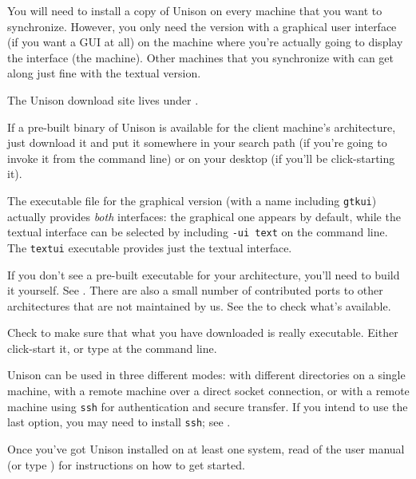 \documentclass{article}
\begin{document}
You will need to install a copy of Unison on every machine that you
want to synchronize.  However, you only need the version with a
graphical user interface (if you want a GUI at all) on the machine
where you're actually going to display the interface (the \CLIENT{}
machine).  Other machines that you synchronize with can get along just
fine with the textual version.



The Unison download site lives under 
.

If a pre-built binary of Unison is available for the client machine's
architecture, just download it and put it somewhere in your search
path (if you're going to invoke it from the command line) or on your
desktop (if you'll be click-starting it).

The executable file for the graphical version (with a name including
\verb|gtkui|) actually provides {\em both} interfaces: the graphical one
appears by default, while the textual interface can be selected by including
\verb|-ui text| on the command line.  The \verb|textui| executable
provides just the textual interface.

If you don't see a pre-built executable for your architecture, you'll
need to build it yourself.  See .
There are also a small number of contributed ports to other
architectures that are not maintained by us.  See the
 to check what's available.

Check to make sure that what you have downloaded is really executable.
Either click-start it, or type  at the command
line.  

Unison can be used in three different modes: with different directories on a
single machine, with a remote machine over a direct socket connection, or
with a remote machine using {\tt ssh} for authentication and secure
transfer.  If you intend to use the last option, you may need to install
{\tt ssh}; see .


Once you've got Unison installed on at least one system, read 
 of the user manual (or type ) for instructions on how to get started.
\end{document}
